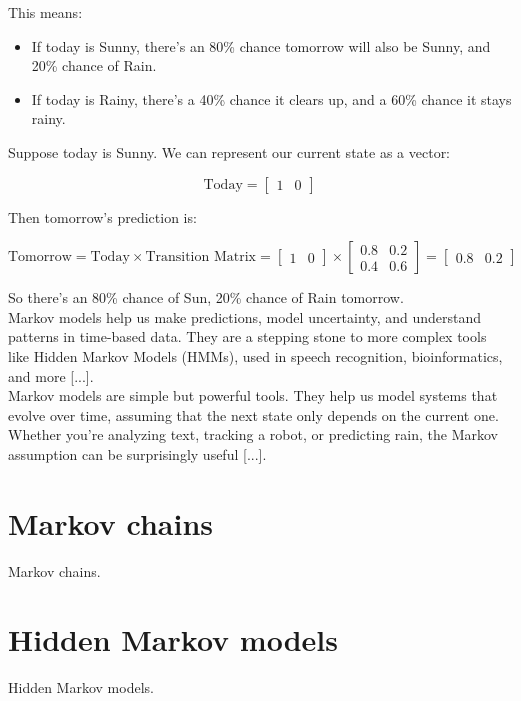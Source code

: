 \documentclass{book}
\begin{document}
This means:
\begin{itemize}
  \item If today is Sunny, there's an 80\% chance tomorrow will also be Sunny, and 20\% chance of Rain.
  \item If today is Rainy, there's a 40\% chance it clears up, and a 60\% chance it stays rainy.
\end{itemize}

Suppose today is Sunny. We can represent our current state as a vector:

\[
\text{Today} = \begin{bmatrix} 1 & 0 \end{bmatrix}
\]

Then tomorrow’s prediction is:

\[
\text{Tomorrow} = \text{Today} \times \text{Transition Matrix} = 
\begin{bmatrix} 1 & 0 \end{bmatrix} \times
\begin{bmatrix}
0.8 & 0.2 \\
0.4 & 0.6
\end{bmatrix}
=
\begin{bmatrix}
0.8 & 0.2
\end{bmatrix}
\]

So there's an 80\% chance of Sun, 20\% chance of Rain tomorrow.\\

Markov models help us make predictions, model uncertainty, and understand patterns in time-based data. They are a stepping stone to more complex tools like Hidden Markov Models (HMMs), used in speech recognition, bioinformatics, and more [...].\\

Markov models are simple but powerful tools. They help us model systems that evolve over time, assuming that the next state only depends on the current one. Whether you’re analyzing text, tracking a robot, or predicting rain, the Markov assumption can be surprisingly useful [...].

\newpage

\section{Markov chains}
Markov chains.

\newpage

\section{Hidden Markov models}
Hidden Markov models.
\end{document}
